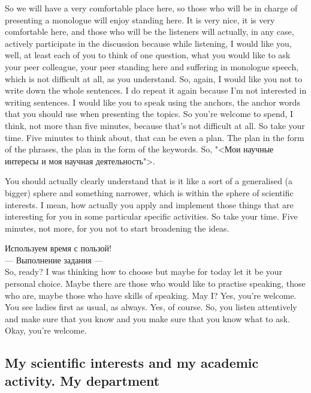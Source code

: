 \documentclass[main.tex]{subfiles}
\begin{document}
So we will have a very comfortable place here, so those who will be in charge of presenting a monologue will enjoy standing here.
It is very nice, it is very comfortable here, and those who will be the listeners will actually, in any case, actively participate in the discussion because while listening, I would like you, well, at least each of you to think of one question, what you would like to ask your peer colleague, your peer standing here and suffering in monologue speech, which is not difficult at all, as you understand.
So, again, I would like you not to write down the whole sentences.
I do repeat it again because I'm not interested in writing sentences.
I would like you to speak using the anchors, the anchor words that you should use when presenting the topics.
So you're welcome to spend, I think, not more than five minutes, because that's not difficult at all.
So take your time.
Five minutes to think about, that can be even a plan.
The plan in the form of the phrases, the plan in the form of the keywords.
So, "<Мои научные интересы и моя научная деятельность">.

You should actually clearly understand that is it like a sort of a generalised (a bigger) sphere and something narrower, which is within the sphere of scientific interests.
I mean, how actually you apply and implement those things that are interesting for you in some particular specific activities.
So take your time.
Five minutes, not more, for you not to start broadening the ideas.

Используем время с пользой!
\\

--- Выполнение задания ---
\\

So, ready?
I was thinking how to choose but maybe for today let it be your personal choice.
Maybe there are those who would like to practise speaking, those who are, maybe those who have skills of speaking.
May I?
Yes, you're welcome.
You see ladies first as usual, as always.
Yes, of course.
So, you listen attentively and make sure that you know and you make sure that you know what to ask.
Okay, you're welcome.

\subsection{My scientific interests and my academic activity. My department}
\end{document}
